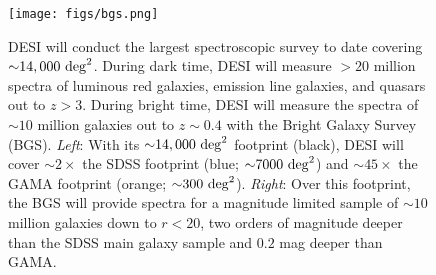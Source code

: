 \begin{figure}
\begin{center}
\texttt{[image: figs/bgs.png]} 
\caption{DESI will conduct the largest spectroscopic survey to 
date covering ${\sim}14,000~{\rm deg}^2$. During dark time, DESI will measure
${>}20$ million spectra of luminous red galaxies, emission line galaxies, and 
quasars out to $z > 3$. During bright time, DESI will measure the spectra of 
${\sim}10$ million galaxies out to $z{\sim}0.4$  with the Bright Galaxy Survey (BGS).
{\em Left}: With its ${\sim}14,000~{\rm deg}^2$ footprint (black), DESI will 
cover ${\sim}2\times$ the SDSS footprint (blue; ${\sim}7000~{\rm deg}^2$) 
and ${\sim}45\times$ the GAMA footprint (orange; ${\sim}300~{\rm deg}^2$). 
{\em Right}: Over this footprint, the BGS will provide spectra for a magnitude 
limited sample of ${\sim}10$ million galaxies down to $r < 20$, two orders of 
magnitude deeper than the SDSS main galaxy sample and $0.2$ mag deeper than GAMA.}
\label{fig:bgs}
\end{center}
\end{figure}
